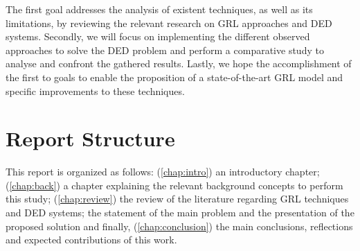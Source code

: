 The first goal addresses the analysis of existent techniques, as well as its limitations, by reviewing the relevant research on \ac{GRL} approaches and \ac{DED} systems. Secondly, we will focus on implementing the different observed approaches to solve the \ac{DED} problem and perform a comparative study to analyse and confront the gathered results. Lastly, we hope the accomplishment of the first to goals to enable the proposition of a state-of-the-art \ac{GRL} model and specific improvements to these techniques.



\section{Report Structure} \label{sec:intro-structure}

\begin{comment}
	TODO -> Update
\end{comment}
	

This report is organized as follows: (\ref{chap:intro}) an introductory chapter; (\ref{chap:back}) a chapter explaining the relevant background concepts to perform this study; (\ref{chap:review}) the review of the literature regarding \ac{GRL} techniques and \ac{DED} systems; the statement of the main problem and the presentation of the proposed solution and finally, (\ref{chap:conclusion}) the main conclusions, reflections and expected contributions of this work.

